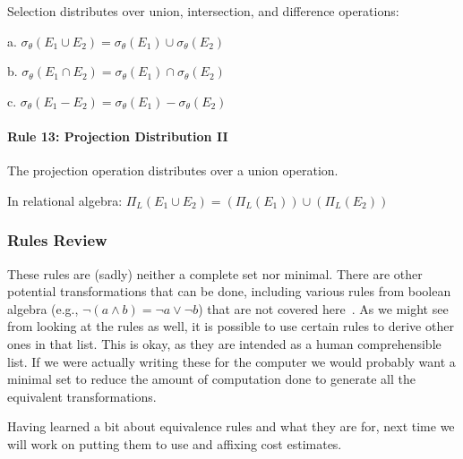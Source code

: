 Selection distributes over union, intersection, and difference operations:

a. $\sigma_{\theta}(E_{1} \cup E_{2}) = \sigma_{\theta}(E_{1}) \cup \sigma_{\theta}(E_{2})$

b. $\sigma_{\theta}(E_{1} \cap E_{2}) = \sigma_{\theta}(E_{1}) \cap \sigma_{\theta}(E_{2})$

c. $\sigma_{\theta}(E_{1} - E_{2}) = \sigma_{\theta}(E_{1}) - \sigma_{\theta}(E_{2})$

\paragraph{Rule 13: Projection Distribution II}
The projection operation distributes over a union operation.

In relational algebra: $\Pi_{L}(E_{1} \cup E_{2}) = (\Pi_{L}(E_{1}))\cup(\Pi_{L}(E_{2}))$

\subsubsection*{Rules Review}

These rules are (sadly) neither a complete set nor minimal. There are other potential transformations that can be done, including various rules from boolean algebra (e.g., $\neg (a \wedge b) = \neg a \vee \neg b$) that are not covered here~\cite{fds}. As we might see from looking at the rules as well, it is possible to use certain rules to derive other ones in that list. This is okay, as they are intended as a human comprehensible list. If we were actually writing these for the computer we would probably want a minimal set to reduce the amount of computation done to generate all the equivalent transformations. 

Having learned a bit about equivalence rules and what they are for, next time we will work on putting them to use and affixing cost estimates.




